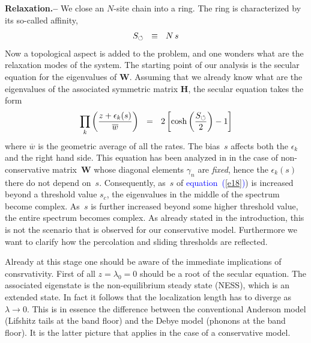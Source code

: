\documentclass[aps,pre,floats,floatfix,twocolumn]{revtex4}
\newcommand{\be}[1]{\begin{eqnarray}\ifthenelse{#1=-1}{\nonumber}{\ifthenelse{#1=0}{}{\label{e#1}}}}
\newcommand{\eeq}{\end{eqnarray}}
\newcommand{\Eq}[1]{\textcolor{blue}{{equation}\!~(\ref{#1})}}
\newcommand{\sect}[1]{{\bf #1.-- }}
\begin{document}
\sect{Relaxation}
%
We close an $N$-site chain into a ring. 
The ring is characterized by its so-called affinity, 
%
\be{18}
S_{\circlearrowleft} \ \ \equiv \ \ N \, s
\eeq 
%
Now a topological aspect is added to the problem, 
and one wonders what are the relaxation modes of the system. 
%
The starting point of our analysis is the secular 
equation for the eigenvalues of $\bm{W}$.
Assuming that we already know what are the eigenvalues 
of the associated symmetric matrix $\bm{H}$,    
the secular equation takes the form \cite{XXX} 
%
\be{20}
\prod_k \left(\frac{z+\epsilon_k(s)}{\overline{w}}\right) \ \ = \ \ 2\left[\cosh\left(\frac{S_{\circlearrowleft}}{2}\right)-1\right]
\eeq
%
where ${\overline{w}}$ is the geometric average of all the rates.
The bias~$s$ affects both the $\epsilon_k$ and the right hand side.
%
This equation has been analyzed in \cite{Shnerb1} 
in the case of non-conservative matrix~$\bm{W}$ 
whose diagonal elements $\gamma_n$ are {\em fixed}, 
hence the $\epsilon_k(s)$ there do not depend on~$s$. 
Consequently, as~$s$ of \Eq{e18}) is increased beyond 
a threshold value $s_{c}$, the eigenvalues in the middle 
of the spectrum become complex. 
As~$s$ is further increased beyond some higher threshold value, 
the entire spectrum becomes complex. 
As already stated in the introduction, this is not the scenario 
that is observed for our conservative model.
Furthermore we want to clarify how the percolation 
and sliding thresholds are reflected.

Already at this stage one should be aware of the immediate 
implications of consrvativity. First of all ${z=\lambda_0=0}$ 
should be a root of the secular equation. 
The associated eigenstate is the non-equilibrium steady state (NESS), 
which is an extended state. 
In fact it follows that the localization length has 
to diverge as ${\lambda\rightarrow0}$. 
This is in essence the difference between the 
conventional Anderson model (Lifshitz tails at the band floor) 
and the Debye model (phonons at the band floor). 
It is the latter picture that applies in the 
case of a conservative model.    
\end{document}
